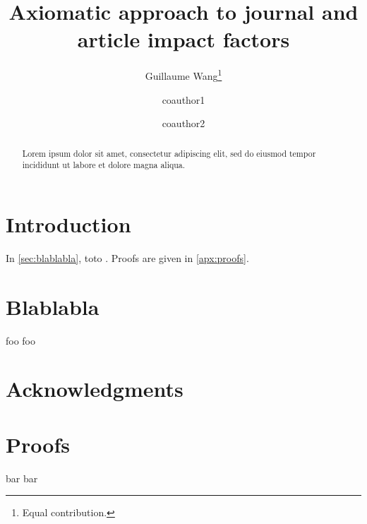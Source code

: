 \documentclass{article}
\title{Axiomatic approach to journal and article impact factors}
\date{}
\author[1]{Guillaume Wang\footnote{Equal contribution.}}
\author[1,2]{coauthor1\protect\CoAuthorMark}
\author[1]{coauthor2}
\affil[1]{affil1}
\affil[2]{affil2}
\begin{document}
\maketitle

%
%
%
%

\begin{abstract}
	Lorem ipsum dolor sit amet, consectetur adipiscing elit, sed do eiusmod tempor incididunt ut labore et dolore magna aliqua.
\end{abstract}

\section{Introduction} \label{sec:intro}
In \autoref{sec:blablabla}, toto \cite{kolmogorov_entropy_1959}. Proofs are given in \autoref{apx:proofs}.


\section{Blablabla} \label{sec:blablabla}
foo foo



\section*{Acknowledgments}


\printbibliography
{} %

\newpage
\appendix

%

\section{Proofs} \label{apx:proofs}
bar bar
\end{document}

